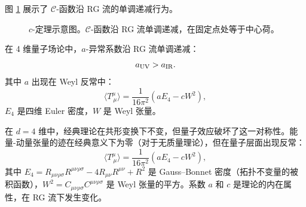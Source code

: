 图 \ref{fig:c_theorem} 展示了 $\mathcal{C}$-函数沿 RG 流的单调递减行为。

\begin{figure}[htbp]
\centering
{}
\caption{$c$-定理示意图。$\mathcal{C}$-函数沿 RG 流单调递减，在固定点处等于中心荷。}
\label{fig:c_theorem}
\end{figure}

\begin{theorem}\label{thm:a-theorem}
在 4 维量子场论中，$a$-异常系数沿 RG 流单调递减：
\begin{equation}
    a_{\rm UV} > a_{\rm IR}.
\end{equation}
其中 $a$ 出现在 Weyl 反常中：
\begin{equation}\label{eq:weyl_anomaly}
    \langle T^\mu_{\ \mu}\rangle = \frac{1}{16\pi^2}\left(a E_4 - c W^2\right),
\end{equation}
$E_4$ 是四维 Euler 密度，$W$ 是 Weyl 张量。
\end{theorem}

\begin{definition}\label{def:weyl_anomaly}
在 $d = 4$ 维中，经典理论在共形变换下不变，但量子效应破坏了这一对称性。能量-动量张量的迹在经典意义下为零（对于无质量理论），但在量子层面出现反常：
\begin{equation}
    \langle T^\mu_{\ \mu}\rangle = \frac{1}{16\pi^2}\left(a E_4 - c W^2\right),
\end{equation}
其中 $E_4 = R_{\mu\nu\rho\sigma}R^{\mu\nu\rho\sigma} - 4R_{\mu\nu}R^{\mu\nu} + R^2$ 是 Gauss--Bonnet 密度（拓扑不变量的被积函数），$W^2 = C_{\mu\nu\rho\sigma}C^{\mu\nu\rho\sigma}$ 是 Weyl 张量的平方。系数 $a$ 和 $c$ 是理论的内在属性，在 RG 流下发生变化。
\end{definition}

